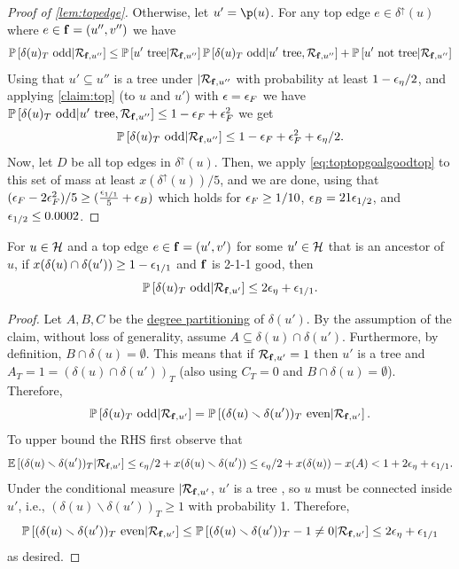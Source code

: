 \begin{proof}[Proof of \cref{lem:topedge}]
Otherwise, let $u'=\p(u)$. For any top edge $e\in\delta^\uparrow(u)$ where $e\in{\bf f}=(u'',v'')$ we have
$$ {\mathbb{P}}\left[\delta(u)_T\text{ odd} | {\mathcal{R}}_{{\bf f},u''}\right] \leq {\mathbb{P}}\left[u'\text{ tree}|{\mathcal{R}}_{{\bf f},u''}\right] {\mathbb{P}}\left[\delta(u)_T\text{ odd} | u'\text{ tree},{\mathcal{R}}_{{\bf f},u''}\right] + {\mathbb{P}}\left[u'\text{ not tree}| {\mathcal{R}}_{{\bf f},u''}\right]
$$
Using that $u'\subseteq u''$ is a tree under $|{\mathcal{R}}_{{\bf f},u''}$ with probability at least $1-{\epsilon}_\eta/2$, and applying \cref{claim:top} (to $u$ and $u'$) with ${\epsilon} = {\epsilon}_F$ 
we have ${\mathbb{P}}\left[\delta(u)_T\text{ odd}|u'\text{ tree}, {\mathcal{R}}_{{\bf f},u''}\right]\leq 1-{\epsilon}_F+{\epsilon}_F^2$ we get
$${\mathbb{P}}\left[\delta(u)_T\text{ odd} | {\mathcal{R}}_{{\bf f},u''}\right] \leq 1-{\epsilon}_F+{\epsilon}_F^2 + {\epsilon}_\eta/2.$$
Now, let $D$ be all top edges in $\delta^\uparrow(u)$. Then, we apply \cref{eq:toptopgoalgoodtop} to this set of mass at least $x(\delta^\uparrow(u))/5$, and we are done, using that $({\epsilon}_F-2{\epsilon}_F^2)/5 \ge (\frac{{\epsilon}_{1/1}}{5} + {\epsilon}_B)$ which holds for ${\epsilon}_F\geq 1/10$, ${\epsilon}_B=21{\epsilon}_{1/2}$, and ${\epsilon}_{1/2}\leq 0.0002$.
\end{proof}

\begin{claim}
\label{claim:211}
For $u\in\mathcal{H}$ and a top edge $e \in {\bf f}=(u',v')$ for some $u'\in\mathcal{H}$ that is an ancestor of $u$, if
 $x(\delta  (u) \cap \delta(u')) \ge 1-{\epsilon}_{1/1}$ and ${\bf f}$ is 2-1-1 good, then 
	$${\mathbb{P}}\left[\delta (u)_T\text{ odd} | {\mathcal{R}}_{{\bf f},u'}\right] \le 2{\epsilon}_\eta + {\epsilon}_{1/1}.$$
\end{claim}
\begin{proof}
Let $A,B,C$ be the \hyperlink{tar:degreepartition}{degree partitioning} of $\delta(u')$.
By the assumption of the claim, without loss of generality, assume $A\subseteq \delta(u)\cap\delta(u')$. Furthermore, by definition, $B \cap \delta(u) = \emptyset$. %
This means that if ${\mathcal{R}}_{{\bf f},u'}=1$ then  $u'$ is a tree and $A_T = 1= (\delta  (u) \cap \delta(u'))_T$ (also using $C_T=0$ and $B \cap \delta(u) = \emptyset$). 
Therefore,
	$${\mathbb{P}}\left[\delta (u)_T\text{ odd} | {\mathcal{R}}_{{\bf f},u'}\right] = {\mathbb{P}}\left[(\delta (u)\smallsetminus \delta(u'))_T \text{ even} |  {\mathcal{R}}_{{\bf f},u'}\right].$$
To upper bound the RHS first observe that
$${\mathbb{E}}\left[(\delta (u)\smallsetminus \delta(u'))_T| {\mathcal{R}}_{{\bf f},u'}\right] \leq {\epsilon}_\eta/2 + x(\delta (u)\smallsetminus \delta(u')) \leq {\epsilon}_\eta/2 + x(\delta(u)) - x(A) < 1+2{\epsilon}_\eta+{\epsilon}_{1/1}. $$
Under the conditional measure $|{\mathcal{R}}_{{\bf f},u'}$,  $u'$ is a tree ,  so $u$ must be connected inside $u'$, i.e.,  $(\delta (u)\smallsetminus \delta(u'))_T\geq 1$ with probability 1.  Therefore, 
$${\mathbb{P}}\left[(\delta (u)\smallsetminus \delta(u'))_T \text{ even} |  {\mathcal{R}}_{{\bf f},u'}\right] \leq {\mathbb{P}}\left[(\delta (u)\smallsetminus \delta(u'))_T-1 \neq 0 |  {\mathcal{R}}_{{\bf f},u'}\right] \leq 2{\epsilon}_{\eta}+{\epsilon}_{1/1}$$
as desired.
\end{proof}

